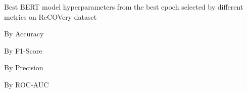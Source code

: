 \begin{table}[!htbp]
    \caption{Best BERT model hyperparameters from the best epoch selected by different metrics on ReCOVery dataset}
    \label{tab:recovery_bert_hparams}
    \centering

    \begin{subtable}[t]{0.48\linewidth}
        \scriptsize
        \caption{By Accuracy}
        
    \end{subtable}
    \hfill
    \begin{subtable}[t]{0.48\linewidth}
        \scriptsize
        \caption{By F1-Score}
        
    \end{subtable}

    \vspace{1em}

    \begin{subtable}[t]{0.48\linewidth}
        \scriptsize
        \caption{By Precision}
        
    \end{subtable}
    \hfill
    \begin{subtable}[t]{0.48\linewidth}
        \scriptsize
        \caption{By ROC-AUC}
        
    \end{subtable}


\end{table}